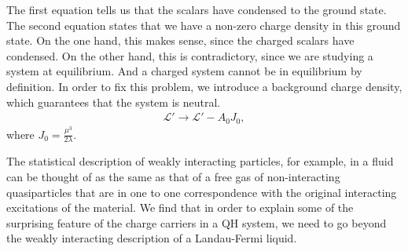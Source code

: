         The first equation tells us that the scalars have condensed to the ground state. The second equation states that we have a non-zero charge density in this ground state. On the one hand, this makes sense, since the charged scalars have condensed. On the other hand, this is contradictory, since we are studying a system at equilibrium. And a charged system cannot be in equilibrium by definition. In order to fix this problem, we introduce a background charge density, which guarantees that the system is neutral.
        \begin{align}
            \mathcal{L}' \rightarrow \mathcal{L}' - A_0 J_0,
        \end{align}
        where $J_0 = \frac{\mu^3}{2\lambda}$.

        The statistical description of weakly interacting particles, for example, in a fluid can be thought of as the same as that of a free gas of non-interacting quasiparticles that are in one to one correspondence with the original interacting excitations of the material. We find that in order to explain some of the surprising feature of the charge carriers in a QH system, we need to go beyond the weakly interacting description of a Landau-Fermi liquid.
